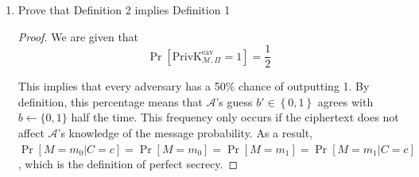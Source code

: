 \documentclass{article}
\begin{document}
\begin{enumerate}
\begin{enumerate}
      \item Prove that Definition 2 implies Definition 1
        
        \begin{proof}

            We are given that
            \[
            \Pr[\text{PrivK}_{\mathcal{M}, \Pi}^{\text{eav}} = 1] = \frac{1}{2}
          \]

            This implies that every adversary has a 50\% chance of outputting 1. By definition, this percentage means that $\mathcal{A}$'s guess $b' \in \left\{0, 1\right\}$ agrees with $b \leftarrow \{0, 1\}$ half the time. This frequency only occurs if the ciphertext does not affect $\mathcal{A}$'s knowledge of the message probability. As a result, $\Pr[M = m_0 | C = c] = \Pr[M = m_0] = \Pr[M = m_1] = \Pr[M = m_1 | C = c]$, which is the definition of perfect secrecy.

          \end{proof}
    \end{enumerate}
\end{enumerate}
\end{document}
